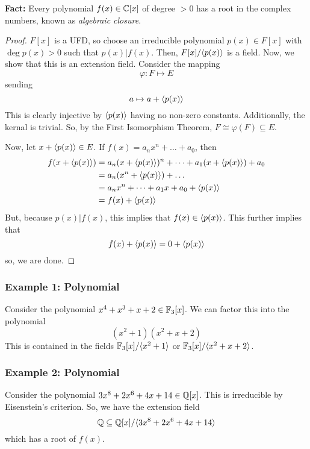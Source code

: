 \documentclass[letterpaper]{article}
\begin{document}
\textbf{Fact:} Every polynomial $f(x) \in \mathbb{C}[x]$ of degree $> 0$ has a root in the complex numbers, known as \emph{algebraic closure}.

\begin{mdframed}[]
    \begin{proof}
        $F[x]$ is a UFD, so choose an irreducible polynomial $p(x) \in F[x]$ with $\deg p(x) > 0$ such that $p(x) | f(x)$. Then, $F[x] / \langle p(x) \rangle$ is a field. Now, we show that this is an extension field. Consider the mapping 
        \[\varphi: F \mapsto E\]
        sending 
        \[a \mapsto a + \langle p(x) \rangle\]
        This is clearly injective by $\langle p(x) \rangle$ having no non-zero constants. Additionally, the kernal is trivial. So, by the First Isomorphism Theorem, $F \cong \varphi(F) \subseteq E$. 

        \bigskip 

        Now, let $x + \langle p(x) \rangle \in E$. If $f(x) = a_n x^n + \dots + a_0$, then 
        \begin{equation*}
            \begin{aligned}
                f(x + \langle p(x) \rangle) &= a_n (x + \langle p(x) \rangle)^n + \dots + a_1 (x + \langle p(x) \rangle) + a_0 \\ 
                    &= a_n (x^n + \langle p(x) \rangle) + \dots \\ 
                    &= a_n x^n + \dots + a_1 x + a_0 + \langle p(x) \rangle \\ 
                    &= f(x) + \langle p(x) \rangle 
            \end{aligned}
        \end{equation*}
        But, because $p(x) | f(x)$, this implies that $f(x) \in \langle p(x) \rangle$. This further implies that 
        \[f(x) + \langle p(x) \rangle = 0 + \langle p(x) \rangle\]
        so, we are done. 
    \end{proof}
\end{mdframed}

\subsubsection{Example 1: Polynomial}
Consider the polynomial $x^4 + x^3 + x + 2 \in \mathbb{F}_{3}[x]$. We can factor this into the polynomial
\[(x^2 + 1)(x^2 + x + 2)\]
This is contained in the fields $\mathbb{F}_{3}[x] / \langle x^2 + 1 \rangle$ or $\mathbb{F}_{3}[x] / \langle x^2 + x + 2 \rangle$.

\subsubsection{Example 2: Polynomial}
Consider the polynomial $3x^8 + 2x^6 + 4x + 14 \in \mathbb{Q}[x]$. This is irreducible by Eisenstein's criterion. So, we have the extension field 
\[\mathbb{Q} \subseteq \mathbb{Q}[x] / \langle 3x^8 + 2x^6 + 4x + 14 \rangle\]
which has a root of $f(x)$. 
\end{document}

